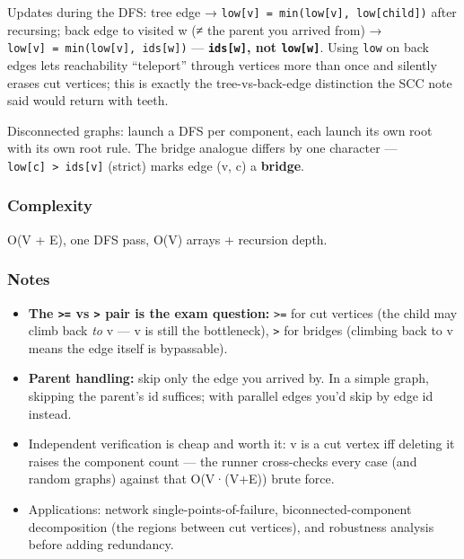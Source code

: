 \documentclass[
  10pt,
  letterpaper,
  onecolumn]{article}
\providecommand{\tightlist}{%
  \setlength{\itemsep}{0pt}\setlength{\parskip}{0pt}}
\begin{document}
Updates during the DFS: tree edge →
\texttt{low{[}v{]}\ =\ min(low{[}v{]},\ low{[}child{]})} after
recursing; back edge to visited w (≠ the parent you arrived from) →
\texttt{low{[}v{]}\ =\ min(low{[}v{]},\ ids{[}w{]})} ---
\textbf{\texttt{ids{[}w{]}}, not \texttt{low{[}w{]}}}. Using
\texttt{low} on back edges lets reachability ``teleport'' through
vertices more than once and silently erases cut vertices; this is
exactly the tree-vs-back-edge distinction the SCC note said would return
with teeth.

Disconnected graphs: launch a DFS per component, each launch its own
root with its own root rule. The bridge analogue differs by one
character --- \texttt{low{[}c{]}\ \textgreater{}\ ids{[}v{]}} (strict)
marks edge (v, c) a \textbf{bridge}.

\hypertarget{complexity-21}{%
\subsubsection{Complexity}\label{complexity-21}}

O(V + E), one DFS pass, O(V) arrays + recursion depth.

\hypertarget{notes-20}{%
\subsubsection{Notes}\label{notes-20}}

\begin{itemize}
\tightlist
\item
  \textbf{The \texttt{\textgreater{}=} vs \texttt{\textgreater{}} pair
  is the exam question:} \texttt{\textgreater{}=} for cut vertices (the
  child may climb back \emph{to} v --- v is still the bottleneck),
  \texttt{\textgreater{}} for bridges (climbing back to v means the edge
  itself is bypassable).
\item
  \textbf{Parent handling:} skip only the edge you arrived by. In a
  simple graph, skipping the parent's id suffices; with parallel edges
  you'd skip by edge id instead.
\item
  Independent verification is cheap and worth it: v is a cut vertex iff
  deleting it raises the component count --- the runner cross-checks
  every case (and random graphs) against that O(V·(V+E)) brute force.
\item
  Applications: network single-points-of-failure, biconnected-component
  decomposition (the regions between cut vertices), and robustness
  analysis before adding redundancy.
\end{itemize}
\end{document}
